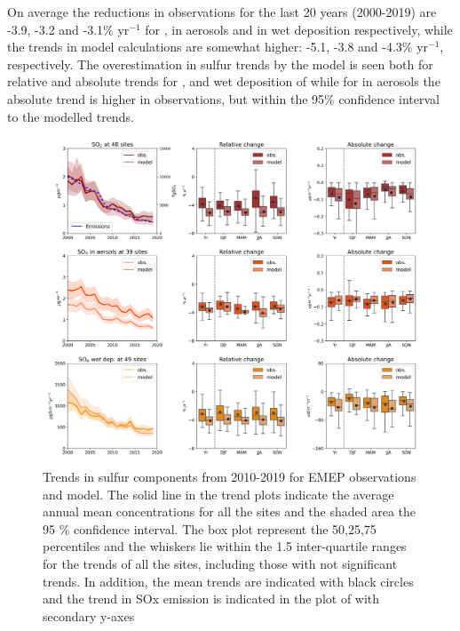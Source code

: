 On average the reductions in observations for the last 20 years (2000-2019) are -3.9, -3.2 and -3.1\% yr$^{-1}$ for \soii, \soiv in aerosols and in wet deposition respectively, while the trends in model calculations are somewhat higher: -5.1, -3.8 and -4.3\% yr$^{-1}$, respectively. The overestimation in sulfur trends by the model is seen both for relative and absolute trends for \soii, and wet deposition of \soiv while for \soiv in aerosols the absolute trend is higher in observations, but within the 95\% confidence interval to the modelled trends.


\begin{figure}
	\centering
	\includegraphics[width=0.74\paperwidth]{FIGS_TRENDS/sulfur_trends.png}
	\caption{\label{fig:SOx_trends}Trends in sulfur components from 2010-2019 for EMEP observations and model. The solid line in the trend plots indicate the average annual mean concentrations for all the sites and the shaded area the 95 \% confidence interval. The box plot represent the 50,25,75 percentiles and the whiskers lie within the 1.5 inter-quartile ranges for the trends of all the sites, including those with not significant trends. In addition, the mean trends are indicated with black circles and the trend in SOx emission is indicated in the plot of \soii with secondary y-axes}
\end{figure}

